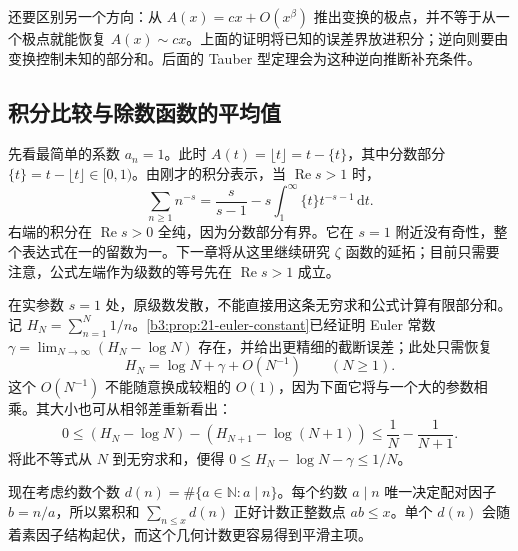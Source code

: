 还要区别另一个方向：从 \(A(x)=cx+O(x^\beta)\) 推出变换的极点，并不等于从一个极点就能恢复 \(A(x)\sim cx\)。上面的证明将已知的误差界放进积分；逆向则要由变换控制未知的部分和。后面的 Tauber 型定理会为这种逆向推断补充条件。


\subsection{积分比较与除数函数的平均值}
\label{b3:subsec:250304}

先看最简单的系数 \(a_n=1\)。此时 \(A(t)=\lfloor t\rfloor=t-\{t\}\)，其中分数部分 \(\{t\}=t-\lfloor t\rfloor\in[0,1)\)。由刚才的积分表示，当 \(\operatorname{Re}s>1\) 时，
\begin{equation}\label{b3:eq:25-zeta-integral}
\sum_{n\ge1}n^{-s}=\frac{s}{s-1}-s\int_1^\infty\{t\}t^{-s-1}\,\mathrm{d}t.
\end{equation}
右端的积分在 \(\operatorname{Re}s>0\) 全纯，因为分数部分有界。它在 \(s=1\) 附近没有奇性，整个表达式在一的留数为一。下一章将从这里继续研究 \(\zeta\) 函数的延拓；目前只需要注意，公式左端作为级数的等号先在 \(\operatorname{Re}s>1\) 成立。

在实参数 \(s=1\) 处，原级数发散，不能直接用这条无穷求和公式计算有限部分和。记 \(H_N=\sum_{n=1}^N1/n\)。\cref{b3:prop:21-euler-constant}已经证明 Euler 常数 \(\gamma=\lim_{N\to\infty}(H_N-\log N)\) 存在，并给出更精细的截断误差；此处只需恢复
\[
 H_N=\log N+\gamma+O(N^{-1})\qquad(N\ge1).
\]
这个 \(O(N^{-1})\) 不能随意换成较粗的 \(O(1)\)，因为下面它将与一个大的参数相乘。其大小也可从相邻差重新看出：
\[
 0\le (H_N-\log N)-(H_{N+1}-\log(N+1))
 \le\frac1N-\frac1{N+1}.
\]
将此不等式从 \(N\) 到无穷求和，便得 \(0\le H_N-\log N-\gamma\le1/N\)。

现在考虑约数个数 \(d(n)=\#\{a\in\mathbb N:a\mid n\}\)。每个约数 \(a\mid n\) 唯一决定配对因子 \(b=n/a\)，所以累积和 \(\sum_{n\le x}d(n)\) 正好计数正整数点 \(ab\le x\)。单个 \(d(n)\) 会随着素因子结构起伏，而这个几何计数更容易得到平滑主项。

